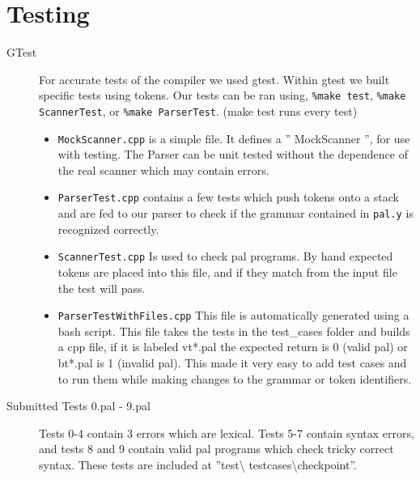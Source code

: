 \documentclass{article}
\begin{document}
\section*{Testing}
\begin{description}
	
\item[GTest]
	For accurate tests of the compiler we used gtest. Within gtest we
	built specific tests using tokens. Our tests can be ran using,
	\texttt{\%make test}, \texttt{\%make ScannerTest}, or \texttt{\%make ParserTest}.
	(make test runs every test)
	\begin{itemize}
		\item \texttt{MockScanner.cpp} is a simple file. It defines a 
		'' MockScanner '', for use with testing. The Parser can be unit tested
		without the dependence of the real scanner which may contain errors.
		\item \texttt{ParserTest.cpp} contains a few tests which push
		tokens onto a stack and are fed to our parser to check if the 
		grammar contained in  \texttt{pal.y} is recognized correctly.
		
		\item \texttt{ScannerTest.cpp} Is used to check pal programs.
		By hand expected tokens are placed into this file, and if they match
		from the input file the test will pass.
		
		\item \texttt{ParserTestWithFiles.cpp} This file is automatically
		generated using a bash script. This file takes the tests in
		the test\_cases folder and builds a cpp file, if it is labeled vt*.pal
		the expected return is 0 (valid pal) or bt*.pal is 1 (invalid pal).
		This made it very easy to add test cases and to run them while making 
		changes to the grammar or token identifiers.
	\end{itemize}
\item[Submitted Tests 0.pal - 9.pal]
	Tests 0-4 contain 3 errors which are lexical. Tests 5-7 contain
	syntax errors, and tests 8 and 9 contain valid pal programs which 
	check tricky correct syntax. These tests are included at ''test\textbackslash 
	test\textunderscore cases\textbackslash checkpoint''.
\end{description}
\end{document}
